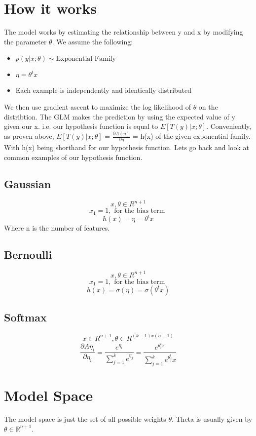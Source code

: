 \documentclass{article}
\newcommand{\R}{\mathbb{R}}
\newcommand{\pard}[2]{\frac{\partial {#1}}{\partial {#2}}}
\begin{document}
\section{How it works}

The model works by estimating the relationship between y and x by modifying the parameter $\theta$.
We assume the following:
\begin{itemize}
    \item $p(y|x;\theta) \sim \text{Exponential Family}$
    \item $\eta = \theta^t x$
    \item Each example is independently and identically distributed
\end{itemize}
We then use gradient ascent to maximize the log likelihood of $\theta$ on the distribtion. 
The GLM makes the prediction by using the expected value of y given our x. i.e. our hypothesis function is equal to $E[T(y) | x; \theta]$. 
Conveniently, as proven above, $E[ T(y) | x; \theta]$ = $\pard{A(\eta)}{\eta}$ = h(x) of the given exponential family. 
With h(x) being shorthand for our hypothesis function. 
Lets go back and look at common examples of our hypothesis function.  
\subsection{Gaussian}
$$x,\theta \in R^{n+1}$$
$$x_1 = 1, \text{ for the bias term }$$
$$h(x) = \eta = \theta^t x$$
Where n is the number of features.
\subsection{Bernoulli}
$$x,\theta \in R^{n+1}$$
$$x_1 = 1, \text{ for the bias term }$$
$$h(x) = \sigma(\eta) = \sigma(\theta^t x )$$
\subsection{Softmax}
$$x \in R^{n+1}, \theta \in R^{(k -  1) x (n + 1)}$$
$$\pard{A{\eta_i}}{\eta_i} = \frac{e^{\eta_i}}{\sum_{j=1}^{k}e^{\eta_j}} = \frac{e^{\theta_i^t x}}{\sum_{j=1}^{k}e^{\theta_j^t} x}$$



\section{Model Space}

The model space is just the set of all possible weights $\theta$. 
Theta is usually given by $\theta \in \R^{n+1}$.
\end{document}

